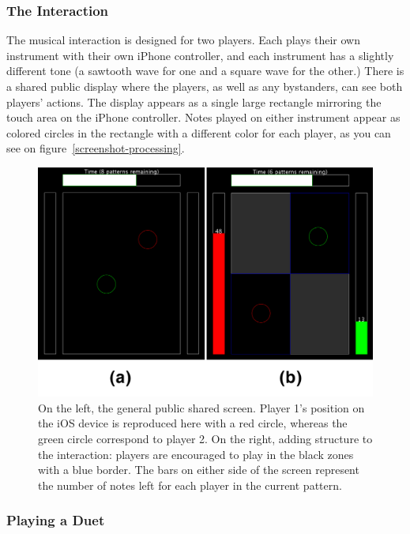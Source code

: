 \documentclass{article}
\begin{document}
\subsubsection{The Interaction}

The musical interaction is designed for two players.  Each plays their own instrument with their own iPhone controller, and each instrument has a slightly different tone (a sawtooth wave for one and a square wave for the other.)  There is a shared public display where the players, as well as any bystanders, can see both players' actions.  The display appears as a single large rectangle mirroring the touch area on the iPhone controller.  Notes played on either instrument appear as colored circles in the rectangle with a different color for each player, as you can see on figure~\ref{screenshot-processing}.

\begin{figure}[tb]
\includegraphics[width=\columnwidth]{screenshot-processing.png}
\caption{On the left, the general public shared screen. Player 1's position on the iOS device is reproduced here with a red circle, whereas the green circle correspond to player 2. On the right, adding structure to the interaction: players are encouraged to play in the black zones with a blue border. The bars on either side of the screen represent the number of notes left for each player in the current pattern.}
\label{struct}
\end{figure}

\subsubsection{Playing a Duet}
\end{document}
